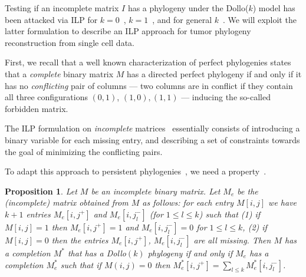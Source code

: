 \documentclass[a4paper,USenglish]{article}
\newtheorem{proposition}[theorem]{Proposition}
\theoremstyle{definition}
\begin{document}
Testing if an incomplete matrix $I$ has a phylogeny under the
Dollo($k$) model has been attacked via ILP for
$k=0$~\cite{Gusfield2007}, $k=1$~\cite{gusfield_persistent_2015}, and
for general $k$~\cite{Bonizzoni:2017:BPP:3107411.3107441}.  We will
exploit the latter formulation to describe an ILP approach for tumor
phylogeny reconstruction from single cell data.


First, we recall that a well known characterization of perfect
phylogenies states that a \emph{complete} binary matrix $M$ has a
directed perfect phylogeny if and only if it has no \emph{conflicting}
pair of columns --- two columns are in conflict if they contain all
three configurations $(0,1)$, $(1,0), (1,1)$ --- inducing the
so-called forbidden matrix.

The ILP formulation on \emph{incomplete} matrices~\cite{Gusfield2007}
essentially consists of introducing a binary variable for each missing
entry, and describing a set of constraints towards the goal of
minimizing the conflicting pairs.

To adapt this approach to persistent
phylogenies~\cite{gusfield_persistent_2015}, we need a
property~\cite{Bonizzoni:2017:BPP:3107411.3107441}.

\begin{proposition}
  \label{proposition:extended matrix}
  Let $M$ be an incomplete binary matrix.  Let $M_{e}$ be the
  (incomplete) matrix obtained from $M$ as follows: for each entry
  $M[i,j]$ we have $k+1$ entries $M_{e}[i,j^{+}]$ and
  $M_{e}[i,j_{l}^{-}]$ (for $1\le l\le k$) such that (1) if
  $M[i,j] = 1$ then $M_{e}[i,j^{+}] = 1$ and $M_{e}[i,j_{l}^{-}] = 0$
  for $1\le l\le k$, (2) if $M[i,j] = 0$ then the entries
  $M_{e}[i,j^{+}]$, $ M_{e}[i,j_{l}^{-}]$ are all missing.  Then $M$
  has a completion $M^{*}$ that has a Dollo$(k)$ phylogeny if and only
  if $M_{e}$ has a completion $M^{*}_{e}$ such that if $M(i,j)= 0$
  then $M^{*}_{e}[i,j^{+}] = \sum_{l\le k} M^{*}_{e}[i,j_{l}^{-}]$.
\end{proposition}
\end{document}
